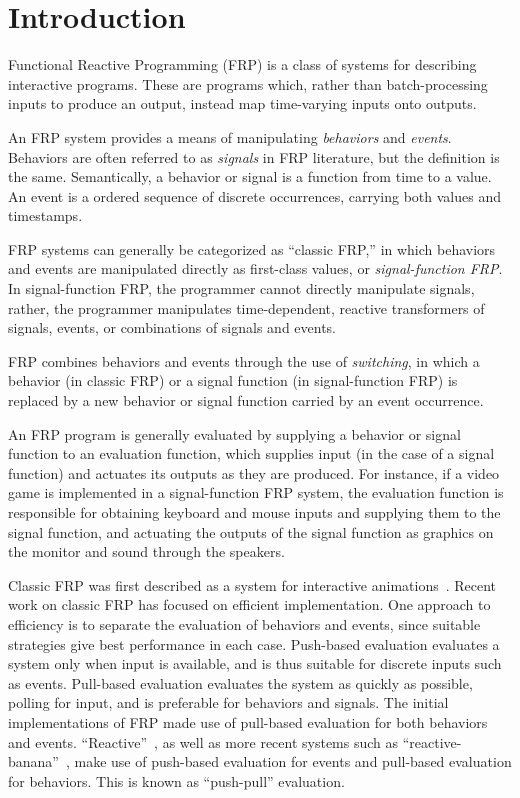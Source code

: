 \section{Introduction}
\label{section:Introduction}

Functional Reactive Programming (FRP) is a class of systems for describing
interactive programs. These are programs which, rather than batch-processing
inputs to produce an output, instead map time-varying inputs onto outputs.


An FRP system provides a means of manipulating {\em behaviors} and
{\em events}. Behaviors are often referred to as {\em signals} in FRP literature,
but the definition is the same.  Semantically, a behavior or signal is a
function from time to a value. An event is a ordered sequence of discrete
occurrences, carrying both values and timestamps.

FRP systems can generally be categorized as ``classic FRP,'' in which behaviors
and events are manipulated directly as first-class values,
or {\em signal-function FRP}. In signal-function FRP, the programmer cannot
directly manipulate signals, rather, the programmer manipulates time-dependent,
reactive transformers of signals, events, or combinations of signals and events.

FRP combines behaviors and events through the use of {\em switching}, in which
a behavior (in classic FRP) or a signal function (in signal-function FRP) is
replaced by a new behavior or signal function carried by an event occurrence.

An FRP program is generally evaluated by supplying a behavior or signal function
to an evaluation function, which supplies input (in the case of a signal
function) and actuates its outputs as they are produced. For instance, if a
video game is implemented in a signal-function FRP system, the evaluation
function is responsible for obtaining keyboard and mouse inputs and supplying
them to the signal function, and actuating the outputs of the signal function
as graphics on the monitor and sound through the speakers.

Classic FRP was first described as a system for interactive animations~\cite{Elliott1997}.
Recent work on classic FRP has focused on efficient implementation. One approach
to efficiency is to separate the evaluation of behaviors and events, since
suitable strategies give best performance in each case. Push-based evaluation
evaluates a system only when input is available, and is thus suitable for
discrete inputs such as events. Pull-based evaluation evaluates the system as
quickly as possible, polling for input, and is preferable for behaviors and
signals. The initial implementations of FRP made use of pull-based evaluation
for both behaviors and events. ``Reactive''~\cite{Elliott2009}, as well as more
recent systems such as ``reactive-banana''~\cite{Apfelmus}, make use of
push-based evaluation for events and pull-based evaluation for behaviors. This
is known as ``push-pull'' evaluation.

